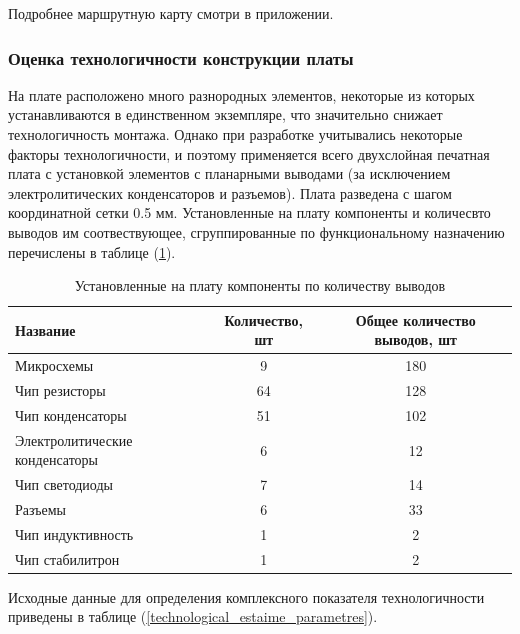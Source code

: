 Подробнее маршрутную карту смотри в приложении.

\subsubsection{Оценка технологичности конструкции платы}
На плате расположено много разнородных элементов, некоторые из которых
устанавливаются в единственном экземпляре, что значительно снижает
технологичность монтажа.
Однако при разработке учитывались некоторые факторы технологичности, и поэтому
применяется всего двухслойная печатная плата с установкой элементов с планарными
выводами (за исключением электролитических конденсаторов и разъемов).
Плата разведена с шагом координатной сетки 0.5 мм.
Установленные на плату компоненты и количесвто выводов им соотвествующее,
сгруппированные по функциональному назначению перечислены в таблице
(\ref{components_and_mount_points}).

\begin{table}
    \centering
    \begin{tabular}{|l|c|c|}
        \hline
        Название & Количество, шт & Общее количество выводов, шт \\ \hline
        Микросхемы & 9 & 180 \\ \hline
        Чип резисторы & 64 & 128 \\ \hline
        Чип конденсаторы & 51 & 102 \\ \hline
        Электролитические конденсаторы & 6 & 12 \\ \hline
        Чип светодиоды & 7 & 14 \\ \hline
        Разъемы & 6 & 33 \\ \hline
        Чип индуктивность & 1 & 2 \\ \hline
        Чип стабилитрон & 1 & 2 \\ \hline
    \end{tabular}
    \caption{Установленные на плату компоненты по количеству выводов}
    \label{components_and_mount_points}
\end{table}

Исходные данные для определения комплексного показателя технологичности
приведены в таблице (\ref{technological_estaime_parametres}).


